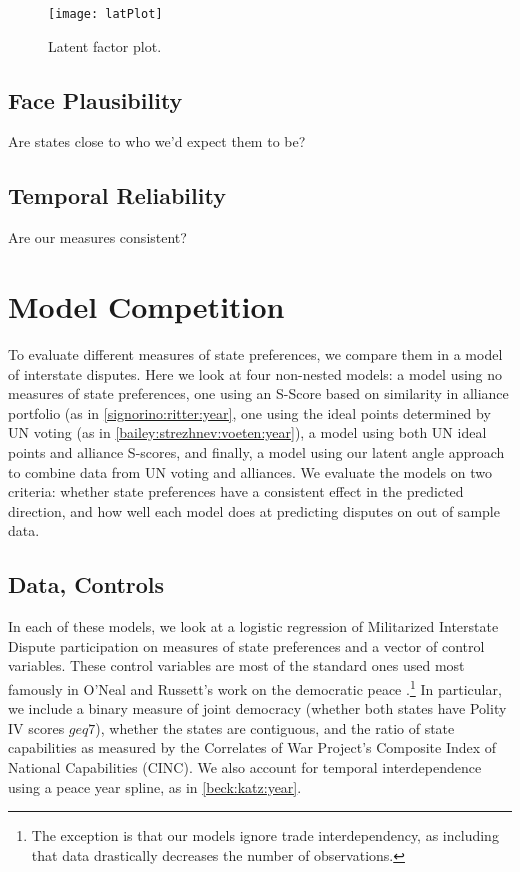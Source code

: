 \begin{figure}[ht]
	\centering
	\texttt{[image: latPlot]}
	\caption{Latent factor plot.}
	\label{fig:latPlot}
\end{figure}

\subsection{Face Plausibility}

Are states close to who we'd expect them to be?

\subsection{Temporal Reliability}

Are our measures consistent?

\section{Model Competition}
To evaluate different measures of state preferences, we compare them in a model of interstate disputes. Here we look at four non-nested models: a model using no measures of state preferences, one using an S-Score based on similarity in alliance portfolio (as in \ref{signorino:ritter:year}, one using the ideal points determined by UN voting (as in \ref{bailey:strezhnev:voeten:year}), a model using both UN ideal points and alliance S-scores, and finally, a model using our latent angle approach to combine data from UN voting and alliances. We evaluate the models on two criteria: whether state preferences have a consistent effect in the predicted direction, and how well each model does at predicting disputes on out of sample data.

\subsection{Data, Controls}
In each of these models, we look at a logistic regression of Militarized Interstate Dispute participation on measures of state preferences and a vector of control variables. These control variables are most of the standard ones used most famously in O'Neal and Russett's work on the democratic peace \citep{oneal:russett:year}.\footnote{The exception is that our models ignore trade interdependency, as including that data drastically decreases the number of observations.} In particular, we include a binary measure of joint democracy (whether both states have Polity IV scores $geq 7$), whether the states are contiguous, and the ratio of state capabilities as measured by the Correlates of War Project's Composite Index of National Capabilities (CINC). We also account for temporal interdependence using a peace year spline, as in \ref{beck:katz:year}. 

